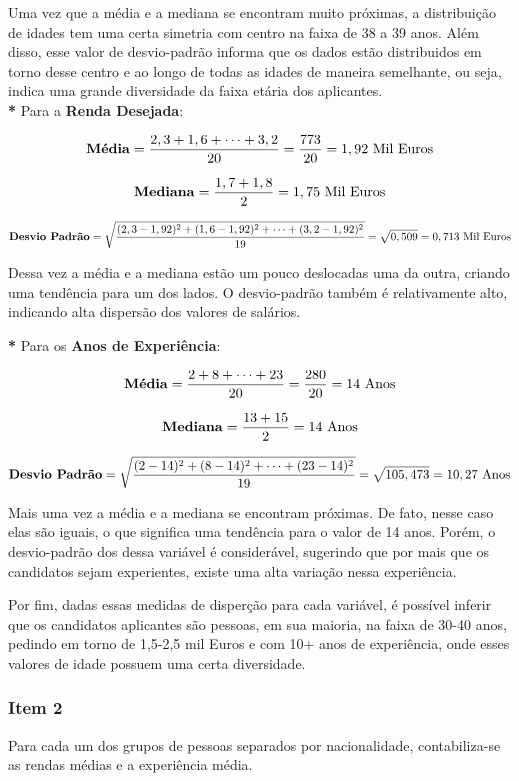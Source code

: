 \documentclass[a4paper,11pt]{article}
\begin{document}
Uma vez que a média e a mediana se encontram muito próximas, a distribuição de idades tem uma certa simetria com centro na faixa de 38 a 39 anos. Além disso, esse valor de desvio-padrão informa que os dados estão distribuidos em torno desse centro e ao longo de todas as idades de maneira semelhante, ou seja, indica uma grande diversidade da faixa etária dos aplicantes. \\


\textbf{*} Para a \textbf{Renda Desejada}:

\[
\text{\textbf{Média}} =  \frac{2,3 + 1,6 + \cdots + 3,2}{20} =  \frac{773}{20} = 1,92 \text{ Mil Euros}
\]
    

\[
\text{\textbf{Mediana}} = \frac{1,7 + 1,8}{2} = 1,75 \text{ Mil Euros}
\]


\[
\text{\textbf{Desvio Padrão}} = \sqrt{\frac{(2,3-1,92)^2 + (1,6-1,92)^2 + \cdots + (3,2-1,92)^2}{19}} = \sqrt{0,509} = 0,713 \text{ Mil Euros}
\]

Dessa vez a média e a mediana estão um pouco deslocadas uma da outra, criando uma tendência para um dos lados. O desvio-padrão também é relativamente alto, indicando alta dispersão dos valores de salários.

\textbf{*} Para os \textbf{Anos de Experiência}:

\[
\text{\textbf{Média}} =  \frac{2 + 8 + \cdots + 23}{20} =  \frac{280}{20} = 14 \text{ Anos}
\]
    

\[
\text{\textbf{Mediana}} = \frac{13 + 15}{2} = 14 \text{ Anos}
\]


\[
\text{\textbf{Desvio Padrão}} = \sqrt{\frac{(2-14)^2 + (8-14)^2 + \cdots + (23-14)^2}{19}} = \sqrt{105,473} = 10,27 \text{ Anos}
\]

Mais uma vez a média e a mediana se encontram próximas. De fato, nesse caso elas são iguais, o que significa uma tendência para o valor de 14 anos. Porém, o desvio-padrão dos dessa variável é considerável, sugerindo que por mais que os candidatos sejam experientes, existe uma alta variação nessa experiência.

Por fim, dadas essas medidas de disperção para cada variável, é possível inferir que os candidatos aplicantes são pessoas, em sua maioria, na faixa de 30-40 anos, pedindo em torno de 1,5-2,5 mil Euros e com 10+ anos de experiência, onde esses valores de idade possuem uma certa diversidade.

\subsubsection{Item 2}
Para cada um dos grupos de pessoas separados por nacionalidade, contabiliza-se as rendas médias e a experiência média.
\end{document}
